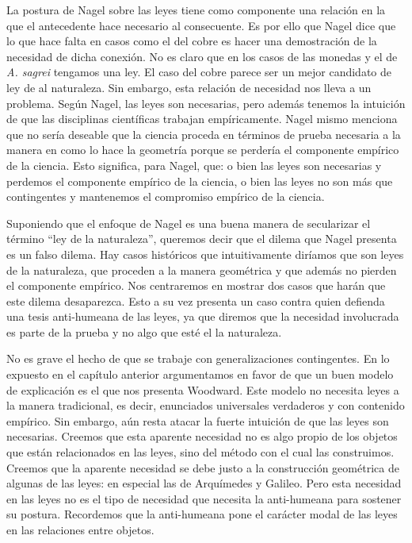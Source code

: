 La postura de Nagel sobre las leyes tiene como componente una relación en la que el antecedente hace necesario al consecuente. Es por ello que Nagel dice que lo que hace falta en casos como el del cobre es hacer una demostración de la necesidad de dicha conexión. No es claro que en los casos de las monedas y el de \emph{A. sagrei} tengamos una ley. El caso del cobre parece ser un mejor candidato de ley de al naturaleza. Sin embargo, esta relación de necesidad nos lleva a un problema. Según Nagel, las leyes son necesarias, pero además tenemos la intuición de que las disciplinas científicas trabajan empíricamente. Nagel mismo menciona que no sería deseable que la ciencia proceda en términos de prueba necesaria a la manera en como lo hace la geometría \cite[cfr., p. 53]{Nagel2006} porque se perdería el componente empírico de la ciencia. Esto significa, para Nagel, que: o bien las leyes son necesarias y perdemos el componente empírico de la ciencia, o bien las leyes no son más que contingentes y mantenemos el compromiso empírico de la ciencia.

Suponiendo que el enfoque de Nagel es una buena manera de secularizar el término ``ley de la naturaleza'', queremos decir que el dilema que Nagel presenta es un falso dilema. Hay casos históricos que intuitivamente diríamos que son leyes de la naturaleza, que proceden a la manera geométrica y que además no pierden el componente empírico. Nos centraremos en mostrar dos casos que harán que este dilema desaparezca. Esto a su vez presenta un caso contra quien defienda una tesis anti-humeana de las leyes, ya que diremos que la necesidad involucrada es parte de la prueba y no algo que esté el la naturaleza.

No es grave el hecho de que se trabaje con generalizaciones contingentes. En lo expuesto en el capítulo anterior argumentamos en favor de que un buen modelo de explicación es el que nos presenta Woodward. Este modelo no necesita leyes a la manera tradicional, es decir, enunciados universales verdaderos y con contenido empírico. Sin embargo, aún resta atacar la fuerte intuición de que las leyes son necesarias. Creemos que esta aparente necesidad no es algo propio de los objetos que están relacionados en las leyes, sino del método con el cual las construimos. Creemos que la aparente necesidad se debe justo a la construcción geométrica de algunas de las leyes: en especial las de Arquímedes y Galileo. Pero esta necesidad en las leyes no es el tipo de necesidad que necesita la anti-humeana para sostener su postura. Recordemos que la anti-humeana pone el carácter modal de las leyes en las relaciones entre objetos.

